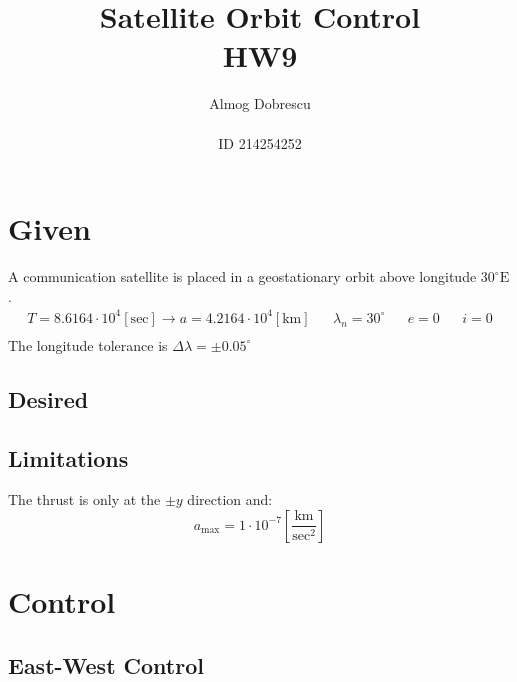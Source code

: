 \documentclass[12pt, a4paper]{article}
\title{Satellite Orbit Control \\ HW9}
\author{Almog Dobrescu\\\\ID 214254252}
\begin{document}
\maketitle

\thispagestyle{empty}
\newpage
\setcounter{page}{1}

\tableofcontents
\vfil
\listoffigures
\newpage

\section{Given}
A communication satellite is placed in a geostationary orbit above longitude $30^\circ\mathrm{E}$.
\begin{equation}
    \begin{matrix}
        T=8.6164\cdot10^4\left[\mathrm{sec}\right]\rightarrow a=4.2164\cdot10^4\left[\mathrm{km}\right] && \lambda_n=30^\circ && e=0 && i=0 \\
    \end{matrix}
\end{equation}
The longitude tolerance is $\Delta\lambda=\pm0.05^\circ$

\subsection{Desired}

\subsection{Limitations}
The thrust is only at the $\pm y$ direction and:
\begin{equation}
    a_{\mathrm{max}}=1\cdot10^{-7}\left[\frac{\mathrm{km}}{\mathrm{sec}^2}\right]
\end{equation}

\section{Control}
\subsection{East-West Control}
\end{document}
